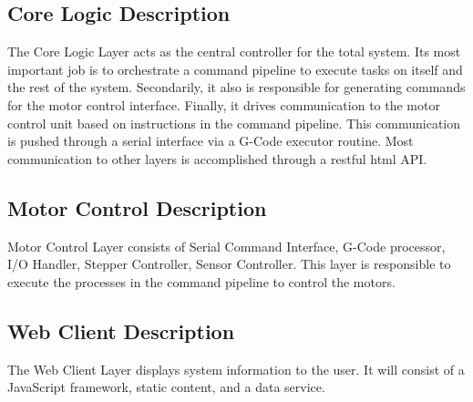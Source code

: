 \subsection{Core Logic Description}
The Core Logic Layer acts as the central controller for the total system. Its most important job is to orchestrate a command pipeline to execute tasks on itself and the rest of the system. Secondarily, it also is responsible for generating commands for the motor control interface. Finally, it drives communication to the motor control unit based on instructions in the command pipeline. This communication is pushed through a serial interface via a G-Code executor routine. Most communication to other layers is accomplished through a restful html API. 

\subsection{Motor Control Description}
Motor Control Layer consists of Serial Command Interface, G-Code processor, I/O Handler, Stepper Controller, Sensor Controller. This layer is responsible to execute the processes in the command pipeline to control the motors. 

\subsection{Web Client Description}
The Web Client Layer displays system information to the user. It will consist of a JavaScript framework, static content, and a data service. 
